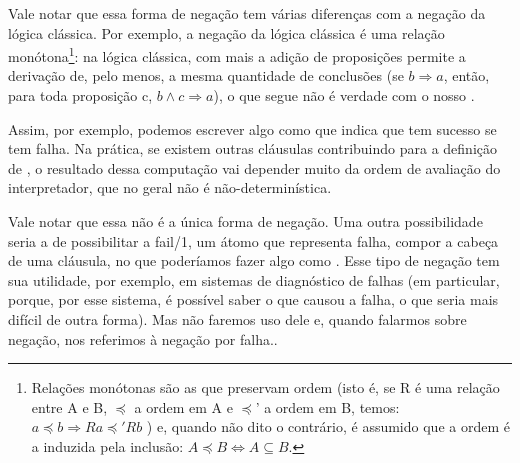 \documentclass{article}
\begin{document}
Vale notar que essa forma de negação tem várias diferenças com a negação da lógica clássica. Por exemplo, a negação da lógica clássica é uma relação monótona\footnote{Relações monótonas são as que preservam ordem (isto é, se R é uma relação entre A e B, $\preceq$ a ordem em A e $\preceq$' a ordem em B, temos: $a \preceq b \Rightarrow Ra \preceq' Rb$ ) e, quando não dito o contrário, é assumido que a ordem é a induzida pela inclusão: $A \preceq B \Leftrightarrow A \subseteq B$.}: na lógica clássica, com mais a adição de proposições permite a derivação de, pelo menos, a mesma quantidade de conclusões (se $b \Rightarrow a$, então, para toda proposição c, $b \wedge c \Rightarrow a$), o que segue não é verdade com o nosso .

Assim, por exemplo, podemos escrever algo como  que indica que  tem sucesso se  tem falha. Na prática, se existem outras cláusulas contribuindo para a definição de , o resultado dessa computação vai depender muito da ordem de avaliação do interpretador, que no geral não é não-determinística.

Vale notar que essa não é a única forma de negação. Uma outra possibilidade seria a de possibilitar a fail/1, um átomo que representa falha, compor a cabeça de uma cláusula, no que poderíamos fazer algo como .
Esse tipo de negação tem sua utilidade, por exemplo, em sistemas de diagnóstico de falhas (em particular, porque, por esse sistema, é possível saber o que causou a falha, o que seria mais difícil de outra forma). Mas não faremos uso dele e, quando
falarmos sobre negação, nos referimos à negação por falha..
\end{document}
